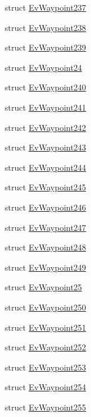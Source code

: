 \begin{DoxyCompactItemize}
\item 
struct \hyperlink{structcl__move__base__z_1_1EvWaypoint237}{Ev\+Waypoint237}
\item 
struct \hyperlink{structcl__move__base__z_1_1EvWaypoint238}{Ev\+Waypoint238}
\item 
struct \hyperlink{structcl__move__base__z_1_1EvWaypoint239}{Ev\+Waypoint239}
\item 
struct \hyperlink{structcl__move__base__z_1_1EvWaypoint24}{Ev\+Waypoint24}
\item 
struct \hyperlink{structcl__move__base__z_1_1EvWaypoint240}{Ev\+Waypoint240}
\item 
struct \hyperlink{structcl__move__base__z_1_1EvWaypoint241}{Ev\+Waypoint241}
\item 
struct \hyperlink{structcl__move__base__z_1_1EvWaypoint242}{Ev\+Waypoint242}
\item 
struct \hyperlink{structcl__move__base__z_1_1EvWaypoint243}{Ev\+Waypoint243}
\item 
struct \hyperlink{structcl__move__base__z_1_1EvWaypoint244}{Ev\+Waypoint244}
\item 
struct \hyperlink{structcl__move__base__z_1_1EvWaypoint245}{Ev\+Waypoint245}
\item 
struct \hyperlink{structcl__move__base__z_1_1EvWaypoint246}{Ev\+Waypoint246}
\item 
struct \hyperlink{structcl__move__base__z_1_1EvWaypoint247}{Ev\+Waypoint247}
\item 
struct \hyperlink{structcl__move__base__z_1_1EvWaypoint248}{Ev\+Waypoint248}
\item 
struct \hyperlink{structcl__move__base__z_1_1EvWaypoint249}{Ev\+Waypoint249}
\item 
struct \hyperlink{structcl__move__base__z_1_1EvWaypoint25}{Ev\+Waypoint25}
\item 
struct \hyperlink{structcl__move__base__z_1_1EvWaypoint250}{Ev\+Waypoint250}
\item 
struct \hyperlink{structcl__move__base__z_1_1EvWaypoint251}{Ev\+Waypoint251}
\item 
struct \hyperlink{structcl__move__base__z_1_1EvWaypoint252}{Ev\+Waypoint252}
\item 
struct \hyperlink{structcl__move__base__z_1_1EvWaypoint253}{Ev\+Waypoint253}
\item 
struct \hyperlink{structcl__move__base__z_1_1EvWaypoint254}{Ev\+Waypoint254}
\item 
struct \hyperlink{structcl__move__base__z_1_1EvWaypoint255}{Ev\+Waypoint255}

\end{DoxyCompactItemize}
